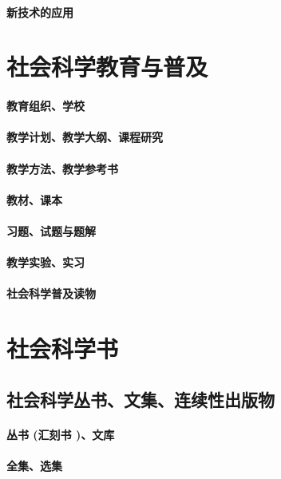\documentclass[UTF8]{../RepresentationUniverse}
\begin{document}
\subsubsection{新技术的应用}


\chapter{社会科学教育与普及}
\subsubsection{教育组织、学校}
\subsubsection{教学计划、教学大纲、课程研究}
\subsubsection{教学方法、教学参考书}
\subsubsection{教材、课本}
\subsubsection{习题、试题与题解}
\subsubsection{教学实验、实习}
\subsubsection{社会科学普及读物}



\chapter{社会科学书}

\section{社会科学丛书、文集、连续性出版物}
    \subsubsection{丛书 (汇刻书 )、文库}
    \subsubsection{全集、选集}
\end{document}
